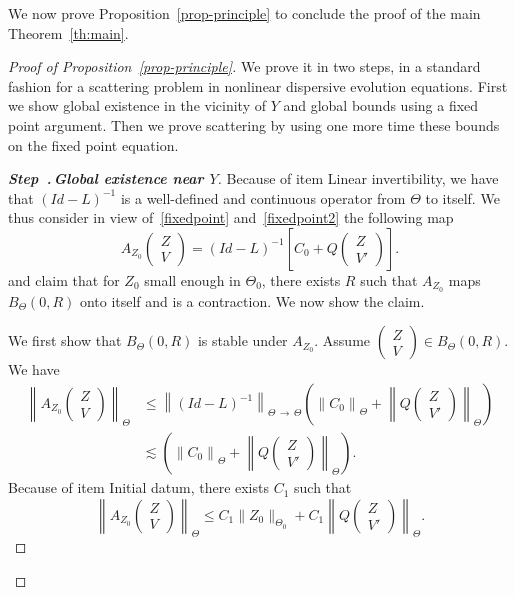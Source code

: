 \documentclass[AHL, Unicode, longabstracts,published]{cedram}
\newcounter{stepcount}
\newenvironment{step}[1]{\refstepcounter{stepcount}\begin{proof}[{\bf{Step~\thestepcount}{.\,\emph{#1}}}]}{\let\qed\relax\end{proof}}
\begin{document}
\vspace{4pt}
We now prove Proposition~\ref{prop-principle} to conclude the proof of the main Theorem~\ref{th:main}.


\begin{proof}[Proof of Proposition~\ref{prop-principle}]
We prove it in two steps, in a standard fashion for a scattering problem in nonlinear dispersive evolution equations. First we show global existence in the vicinity of $Y$ and global bounds using a fixed point argument. Then we prove scattering by using one more time these bounds on the fixed point equation.

\begin{step}{{Global existence near $Y$}}\label{proofpro3.1step1}
Because of item Linear invertibility, we have that $(Id-L)^{-1}$ is a well-defined and continuous operator from $\Theta$ to itself. We thus consider in view of~\eqref{fixedpoint} and~\eqref{fixedpoint2} the following map
\begin{equation} \label{id:fixedpointmainth}
A_{Z_0}
\begin{pmatrix} Z \\V
\end{pmatrix} = (Id-L)^{-1} \left[C_0 + Q
\begin{pmatrix} Z \\V'
\end{pmatrix} \right].
\end{equation}
and claim that for $Z_0$ small enough in $\Theta_0$, there exists $R$ such that $A_{Z_0}$ maps $B_{\Theta}(0,R)$ onto itself and is a contraction. We now show the claim.

We first show that $B_{\Theta}(0,R)$ is stable under $A_{Z_0}$. Assume $
(\begin{smallmatrix} Z \\V
\end{smallmatrix}) \in B_\Theta (0,R)$. We have
\begin{align*}
\left\| A_{Z_0}
\begin{pmatrix} Z \\V
\end{pmatrix} \right\|_{\Theta} &\leq \left\|(Id-L)^{-1}\right\|_{\Theta\,\rightarrow\,\Theta} \left(\left\|C_0\right\|_\Theta + \left\| Q
\begin{pmatrix}
Z \\V'
\end{pmatrix} 
\right\|_\Theta \right)\\
&\lesssim \left(\left\|C_0\right\|_\Theta + \left\| Q
\begin{pmatrix}
Z \\V'
\end{pmatrix} \right\|_\Theta \right).
\end{align*}
Because of item Initial datum, there exists $C_1$ such that
\[
\left\| A_{Z_0}
\begin{pmatrix}
Z \\V
\end{pmatrix} \right\|_{\Theta} \leq C_1 \|Z_0\|_{\Theta_0} +C_1\left\| Q
\begin{pmatrix}
Z \\V'
\end{pmatrix} \right\|_\Theta.
\]


\end{step}
\end{proof}
\end{document}
